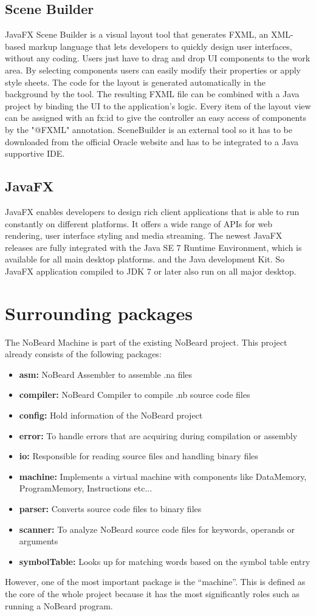 \subsection{Scene Builder} \label{sec:SceneBuilder}
JavaFX Scene Builder is a visual layout tool that generates FXML, an XML-based markup language that lets developers to quickly design user interfaces, without any coding. Users just have to drag and drop UI components to the work area. By selecting components users can easily modify their properties or apply style sheets. The code for the layout is generated automatically in the background by the tool. The resulting FXML file can be combined with a Java project by binding the UI to the application’s logic. Every item of the layout view can be assigned with an fx:id to give the controller an easy access of components by the "@FXML" annotation.  SceneBuilder is an external tool so it has to be downloaded from the official Oracle website and has to be integrated to a Java supportive IDE. 
\subsection{JavaFX}
JavaFX enables developers to design rich client applications that is able to run constantly on different platforms. It offers a wide range of APIs for web rendering, user interface styling and media streaming. The newest JavaFX releases are fully integrated with the Java SE 7 Runtime Environment, which is available for all main desktop platforms. and the Java development Kit. So JavaFX application compiled to JDK 7 or later also run on all major desktop. 
\section{Surrounding packages}
The NoBeard Machine is part of the existing NoBeard project. This project already consists of the following packages:
\begin{itemize}
\item \textbf{asm: }NoBeard Assembler to assemble .na files 
\item \textbf{compiler: }NoBeard Compiler to compile .nb source code files
\item \textbf{config: }Hold information of the NoBeard project
\item \textbf{error: }To handle errors that are acquiring during compilation or assembly   
\item \textbf{io: }Responsible for reading source files and handling binary files 
\item \textbf{machine: }Implements a virtual machine with components like DataMemory, ProgramMemory, Instructions etc...  
\item \textbf{parser: }Converts source code files to binary files
\item \textbf{scanner: }To analyze NoBeard source code files for keywords, operands or arguments  
\item \textbf{symbolTable: }Looks up for matching words based on the symbol table entry  
\end{itemize}
However, one of the most important package is the “machine”. This is defined as the core of the whole project because it has the most significantly roles such as running a NoBeard program.
